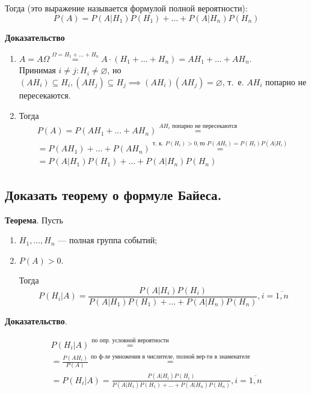Тогда (это выражение называется формулой полной вероятности):
\begin{equation}
	P(A) = P(A|H_{1})P(H_{1}) + ... + P(A|H_{n})P(H_{n})
\end{equation}

\textbf{Доказательство}
\begin{enumerate}
	\item $A = A \Omega \stackrel{\Omega=H_{1} + ... + H_{n}}{=} A \cdot (H_{1} + ... + H_{n}) = AH_{1} + ... + AH_{n}$. \\
	Принимая $i \neq j: H_{i} \neq \varnothing$, но $(AH_{i}) \subseteq H_{i}, (AH_{j}) \subseteq H_{j} \implies (AH_{i})(AH_{j}) = \varnothing$, т.~е. $AH_{i}$ попарно не пересекаются.
	\item Тогда
	\begin{gather*}
		P(A) = P(AH_{1} + ... + AH_{n}) \stackrel{AH_{i} \text{ попарно не пересекаются}}{=} \\
		= P(AH_{1}) + ... + P(AH_{n}) \stackrel{\text{т.~к. } P(H_{i}) > 0, \text{то } P(AH_{i}) = P(H_{i})P(A|H_{i})}{=}\\
		= P(A|H_{1})P(H_{1}) + ... + P(A|H_{n})P(H_{n})
	\end{gather*}
\end{enumerate}

\subsection{Доказать теорему о формуле Байеса.}

\textbf{Теорема}. Пусть
\begin{enumerate}
	\item $H_{1}, ..., H_{n}$ --- полная группа событий;
	\item $P(A) > 0$.
	
	Тогда
	\begin{equation}
		P(H_{i}|A) = \frac{P(A|H_{i})P(H_{i})}{P(A|H_{1})P(H_{1}) + ... + P(A|H_{n})P(H_{n})}, i = \overline{1, n}
	\end{equation}
\end{enumerate}

\textbf{Доказательство}. 

\begin{gather*}
	P(H_{i}|A) \stackrel{\text{по опр. условной вероятности}}{=} \\
	= \frac{P(AH_{i})}{P(A)} \stackrel{\text{по ф-ле умножения в числителе, полной вер-ти в знаменателе}}{=} \\
	= P(H_{i}|A) = \frac{P(A|H_{i})P(H_{i})}{P(A|H_{1})P(H_{1}) + ... + P(A|H_{n})P(H_{n})}, i = \overline{1, n}
\end{gather*}

